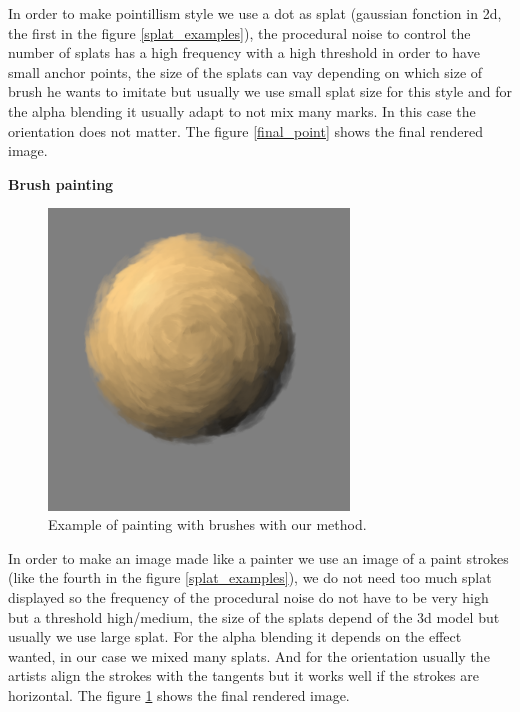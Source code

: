 In order to make pointillism style we use a dot as splat (gaussian fonction in 2d, the first in the figure \ref{splat_examples}), the procedural noise to control the number of splats has a high frequency with a high threshold in order to have small anchor points, the size of the splats can vay depending on which size of brush he wants to imitate but usually we use small splat size for this style and for the alpha blending it usually adapt to not mix many marks. In this case the orientation does not matter. The figure \ref{final_point} shows the final rendered image. \newline

\textbf{Brush painting}

\begin{figure}
    \begin{center}
    \includegraphics[width=80mm, height=80mm]{Resultats/painting1/final.png}
    \end{center}
    \caption{Example of painting with brushes with our method.}
    \label{final_brushes}
\end{figure}

In order to make an image made like a painter we use an image of a paint strokes (like the fourth in the figure \ref{splat_examples}), we do not need too much splat displayed so the frequency of the procedural noise do not have to be very high but a threshold high/medium, the size of the splats depend of the 3d model but usually we use large splat. For the alpha blending it depends on the effect wanted, in our case we mixed many splats. And for the orientation usually the artists align the strokes with the tangents but it works well if the strokes are horizontal. The figure \ref{final_brushes} shows the final rendered image. \newline

